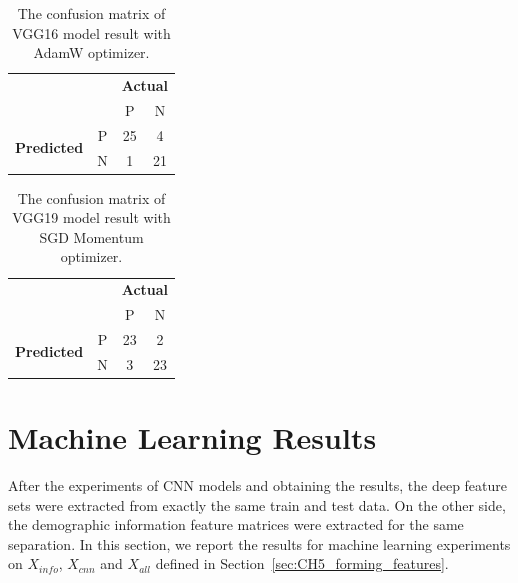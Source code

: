 \begin{table}[!h]
\centering
\caption{The confusion matrix of VGG16 model result with AdamW optimizer.}
\label{tab:conf_vgg16}
\begin{tabular}{|cc|c|c|}
\cline{1-4}
                                                 &   & \multicolumn{2}{c|}{\textbf{Actual}} \\ \cline{3-4} 
                                                 &   & P            & N            \\ \hline
\multicolumn{1}{|c|}{\multirow{2}{*}{\textbf{Predicted}}} & P & 25           & 4            \\ \cline{2-4} 
\multicolumn{1}{|c|}{}                           & N & 1            & 21           \\ \hline
\end{tabular}
\end{table}

\begin{table}[!h]
\centering
\caption{The confusion matrix of VGG19 model result with SGD Momentum optimizer.}
\label{tab:conf_vgg19}
\begin{tabular}{|cc|c|c|}
\cline{1-4}
                                                 &   & \multicolumn{2}{c|}{\textbf{Actual}} \\ \cline{3-4} 
                                                 &   & P            & N            \\ \hline
\multicolumn{1}{|c|}{\multirow{2}{*}{\textbf{Predicted}}} & P & 23           & 2            \\ \cline{2-4} 
\multicolumn{1}{|c|}{}                           & N & 3            & 23           \\ \hline
\end{tabular}
\end{table}

\section{Machine Learning Results}



After the experiments of CNN models and obtaining the results, the deep feature sets were extracted from exactly the same train and test data. On the other side, the demographic information feature matrices were extracted for the same separation. In this section, we report the results for machine learning experiments on $X_{info}$, $X_{cnn}$ and $X_{all}$ defined in Section~\ref{sec:CH5_forming_features}.


